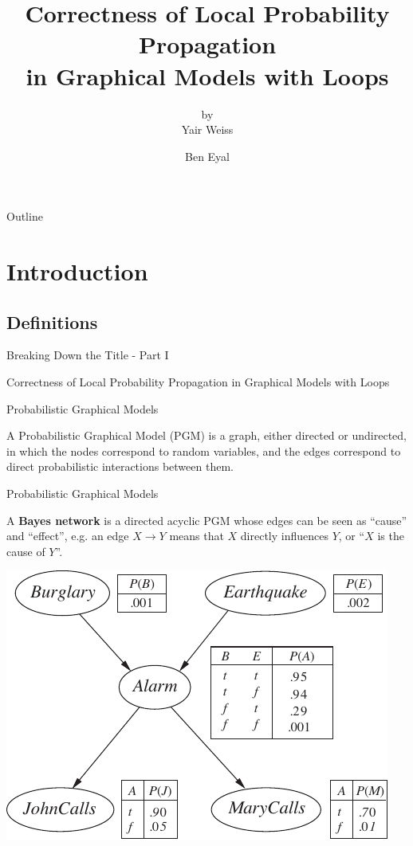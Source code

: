\documentclass{beamer}
\title[]{Correctness of Local Probability Propagation\\in Graphical Models with Loops}
\subtitle{by\\Yair Weiss}
\author{Ben Eyal}
\begin{document}
\begin{frame}
    \titlepage
\end{frame}

\begin{frame}{Outline}
    \tableofcontents
\end{frame}


\section{Introduction}


\subsection{Definitions}
\begin{frame}{Breaking Down the Title - Part I}
    \begin{center}
        \Large{Correctness of Local Probability Propagation in \alert<2>{Graphical Models} with Loops}
    \end{center}
\end{frame}
\begin{frame}{Probabilistic Graphical Models}
    \pause
    \begin{definition}
        A Probabilistic Graphical Model (PGM) is a graph, either directed or undirected, in which the nodes correspond to random variables,
        and the edges correspond to direct probabilistic interactions between them.
    \end{definition}
\end{frame}
\begin{frame}{Probabilistic Graphical Models}
    \pause
    \begin{definition}
        A \textbf{Bayes network} is a directed acyclic PGM whose edges can be seen as ``cause'' and ``effect'', e.g. an
        edge $ X \rightarrow Y $ means that $ X $ directly influences $ Y $, or ``$ X $ is the cause of $ Y $''.
    \end{definition}
    \pause
    \begin{center}
        \includegraphics[scale=0.75]{burglary2}\\
    \end{center}
\end{frame}
\end{document}
